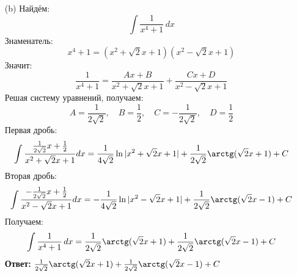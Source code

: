 \documentclass[a4paper]{article}
\begin{document}
\begin{enumerate}
\begin{enumerate}
    \item[(b)]Найдём:
    $$\int \frac{1}{x^4 + 1} \, dx $$
    Знаменатель:
    \[
    x^4 + 1 = (x^2 + \sqrt{2}x + 1)(x^2 - \sqrt{2}x + 1)
    \]
    Значит:
    \[
    \frac{1}{x^4 + 1} = \frac{Ax + B}{x^2 + \sqrt{2}x + 1} + \frac{Cx + D}{x^2 - \sqrt{2}x + 1}
    \]
    Решая систему уравнений, получаем:  
    \[
    A = \frac{1}{2\sqrt{2}}, \quad B = \frac{1}{2}, \quad C = -\frac{1}{2\sqrt{2}}, \quad D = \frac{1}{2}
    \]
    Первая дробь:
    \[
    \int \frac{\frac{1}{2\sqrt{2}}x + \frac{1}{2}}{x^2 + \sqrt{2}x + 1} dx = \frac{1}{4\sqrt{2}} \ln|x^2 + \sqrt{2}x + 1| + \frac{1}{2\sqrt{2}} \arctg(\sqrt{2}x + 1) + C
    \]
    Вторая дробь:
    \[
    \int \frac{-\frac{1}{2\sqrt{2}}x + \frac{1}{2}}{x^2 - \sqrt{2}x + 1} dx= -\frac{1}{4\sqrt{2}} \ln|x^2 - \sqrt{2}x + 1| + \frac{1}{2\sqrt{2}} \arctg(\sqrt{2}x - 1) + C
    \]
    Получаем:
    $$\int \frac{1}{x^4 + 1} \, dx = \frac{1}{2\sqrt{2}} \arctg(\sqrt{2}x + 1) + \frac{1}{2\sqrt{2}} \arctg(\sqrt{2}x - 1) + C$$
    \textbf{Ответ:} $\frac{1}{2\sqrt{2}} \arctg(\sqrt{2}x + 1) + \frac{1}{2\sqrt{2}} \arctg(\sqrt{2}x - 1) + C$
    \end{enumerate}


\end{enumerate}
\end{document}
